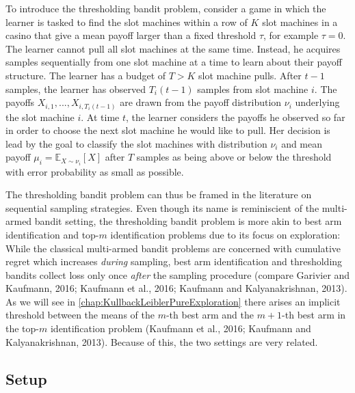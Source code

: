 \documentclass[11pt,]{article}
\begin{document}
To introduce the thresholding bandit problem, consider a game in which
the learner is tasked to find the slot machines within a row of \(K\)
slot machines in a casino that give a mean payoff larger than a fixed
threshold \(\tau\), for example \(\tau = 0\). The learner cannot pull
all slot machines at the same time. Instead, he acquires samples
sequentially from one slot machine at a time to learn about their payoff
structure. The learner has a budget of \(T>K\) slot machine pulls. After
\(t-1\) samples, the learner has observed \(T_i(t-1)\) samples from slot
machine \(i\). The payoffs \(X_{i,1}, ..., X_{i,T_i(t-1)}\) are drawn
from the payoff distribution \(\nu_i\) underlying the slot machine
\(i\). At time \(t\), the learner considers the payoffs he observed so
far in order to choose the next slot machine he would like to pull. Her
decision is lead by the goal to classify the slot machines with
distribution \(\nu_i\) and mean payoff
\(\mu_i = \mathbb{E}_{X \sim \nu_i}[X]\) after \(T\) samples as being
above or below the threshold with error probability as small as
possible.

The thresholding bandit problem can thus be framed in the literature on
sequential sampling strategies. Even though its name is reminiscient of
the multi-armed bandit setting, the thresholding bandit problem is more
akin to best arm identification and top-\(m\) identification problems
due to its focus on exploration: While the classical multi-armed bandit
problems are concerned with cumulative regret which increases
\emph{during} sampling, best arm identification and thresholding bandits
collect loss only once \emph{after} the sampling procedure (compare
Garivier and Kaufmann, 2016; Kaufmann et al., 2016; Kaufmann and
Kalyanakrishnan, 2013). As we will see in
\autoref{chap:KullbackLeiblerPureExploration} there arises an implicit
threshold between the means of the \(m\)-th best arm and the \(m+1\)-th
best arm in the top-\(m\) identification problem (Kaufmann et al., 2016;
Kaufmann and Kalyanakrishnan, 2013). Because of this, the two settings
are very related.

\subsection{\texorpdfstring{Setup
\label{sec:Setup}}{Setup }}\label{setup}
\end{document}
